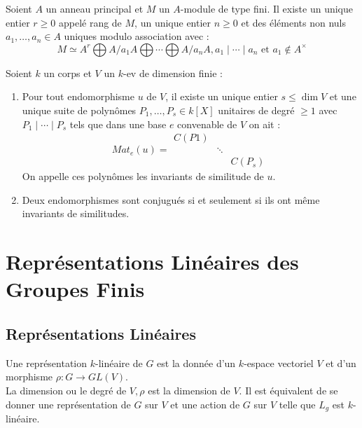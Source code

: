 \documentclass{cours}
\begin{document}
\begin{theorem}
    Soient $A$ un anneau principal et $M$ un $A$-module de type fini. Il existe un unique entier $r \geq 0$ appelé rang de $M$, un unique entier $n \geq 0$ et des éléments non nuls $a_{1}, \ldots, a_{n} \in A$ uniques modulo association avec : 
    \[
        M \simeq A^{r} \bigoplus A/a_{1}A \bigoplus \cdots \bigoplus A/a_{n}A, a_{1} \mid \cdots \mid a_{n} \text{ et } a_{1} \notin A^{\times}
    \] 
\end{theorem}

\begin{theorem}
    Soient $k$ un corps et $V$ un $k$-ev de dimension finie : 
    \begin{enumerate}
        \item Pour tout endomorphisme $u$ de $V$, il existe un unique entier $s \leq \dim V$ et une unique suite de polynômes $P_{1}, \ldots, P_{s} \in k[X]$ unitaires de degré $\geq 1$ avec $P_{1} \mid \cdots \mid P_{s}$ tels que dans une base $e$ convenable de $V$ on ait : 
        \[
            Mat_{e}(u) = \begin{matrix}
                C(P1) & & \\
                & \ddots & \\
                & & C(P_{s})
            \end{matrix}
        \]
        On appelle ces polynômes les invariants de similitude de $u$. 
        \item Deux endomorphismes sont conjugués si et seulement si ils ont même invariants de similitudes. 
    \end{enumerate}
\end{theorem}

\section{Représentations Linéaires des Groupes Finis}
\subsection{Représentations Linéaires}
\begin{definition}
    Une représentation $k$-linéaire de $G$ est la donnée d'un $k$-espace vectoriel $V$ et d'un morphisme $\rho : G \rightarrow GL(V)$.\\
    La dimension ou le degré de $V, \rho$ est la dimension de $V$. Il est équivalent de se donner une représentation de $G$ sur $V$ et une action de $G$ sur $V$ telle que $L_{g}$ est $k$-linéaire. 
\end{definition}
\end{document}
